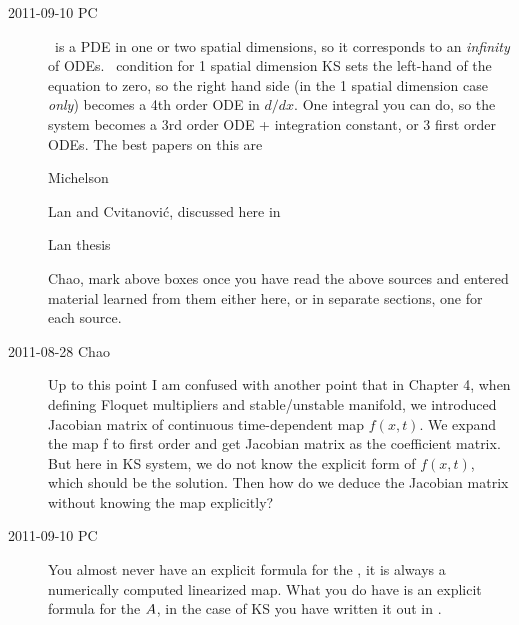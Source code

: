 \begin{description}
\item[2011-09-10 PC]
\KSe\ is a PDE in one or two spatial dimensions, so it corresponds to an
\emph{infinity} of ODEs. \Eqv\ condition for 1 spatial dimension KS sets
the left-hand of the equation to zero, so the right hand side (in the 1
spatial dimension case \emph{only}) becomes a 4th order ODE in $d/dx$.
One integral you can do, so the system becomes a 3rd order ODE +
integration constant, or 3 first order ODEs. The best papers on this are

\noindent
[ ] Michelson

\noindent
[ ] Lan and Cvitanovi{\'c}, discussed here in

\noindent
[ ] Lan thesis

\noindent
Chao, mark above boxes once you have read the above sources and entered
material learned from them either here, or in separate sections, one for
each source.

\item[2011-08-28 Chao]
Up to this point I am confused with another point that in Chapter 4, when
defining Floquet multipliers and stable/unstable manifold, we
introduced Jacobian matrix of continuous time-dependent map $f(x,t)$. We
expand the map f to first order and get Jacobian matrix as the
coefficient matrix. But here in KS system, we do not know the explicit
form of $f(x,t)$, which should be the solution. Then how do we deduce the
Jacobian matrix without knowing the map explicitly?

\item[2011-09-10 PC] You almost never have an explicit formula for the
\JacobianM, it is always a numerically computed linearized map. What you
do have is an explicit formula for the {\stabmat} ${A}$, in the case
of KS you have written it out in .

\end{description}


